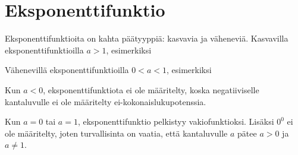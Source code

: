 \chapter{Eksponenttifunktio}


Eksponenttifunktioita on kahta päätyyppiä: kasvavia ja väheneviä.
Kasvavilla eksponenttifunktioilla $a>1$, esimerkiksi


Vähenevillä eksponenttifunktioilla $0<a<1$, esimerkiksi


Kun $a<0$, eksponenttifunktiota ei ole määritelty, koska negatiiviselle
kantaluvulle ei ole määritelty ei-kokonaislukupotenssia.

Kun $a=0$ tai $a=1$, eksponenttifunktio pelkistyy vakiofunktioksi.
Lisäksi $0^0$ ei ole määritelty, joten turvallisinta on vaatia, että
kantaluvulle $a$ pätee $a>0$ ja $a \neq 1$.